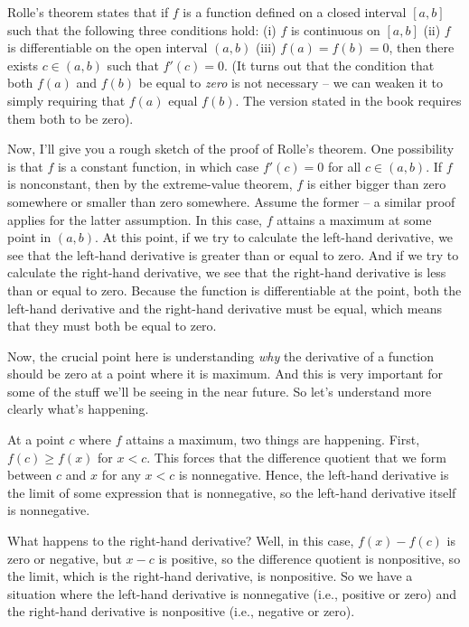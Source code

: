 \documentclass{amsart}
\begin{document}
Rolle's theorem states that if $f$ is a function defined on a closed
interval $[a,b]$ such that the following three conditions hold: (i)
$f$ is continuous on $[a,b]$ (ii) $f$ is differentiable on the open
interval $(a,b)$ (iii) $f(a) = f(b) = 0$, then there exists $c \in
(a,b)$ such that $f'(c) = 0$. (It turns out that the condition that
both $f(a)$ and $f(b)$ be equal to {\em zero} is not necessary -- we
can weaken it to simply requiring that $f(a)$ equal $f(b)$. The
version stated in the book requires them both to be zero).

Now, I'll give you a rough sketch of the proof of Rolle's theorem. One
possibility is that $f$ is a constant function, in which case $f'(c) =
0$ for all $c \in (a,b)$. If $f$ is nonconstant, then by the
extreme-value theorem, $f$ is either bigger than zero somewhere or
smaller than zero somewhere. Assume the former -- a similar proof
applies for the latter assumption. In this case, $f$ attains a maximum
at some point in $(a,b)$. At this point, if we try to calculate the
left-hand derivative, we see that the left-hand derivative is greater
than or equal to zero. And if we try to calculate the right-hand
derivative, we see that the right-hand derivative is less than or
equal to zero. Because the function is differentiable at the point,
both the left-hand derivative and the right-hand derivative must be
equal, which means that they must both be equal to zero.

Now, the crucial point here is understanding {\em why} the derivative
of a function should be zero at a point where it is maximum. And this
is very important for some of the stuff we'll be seeing in the near
future. So let's understand more clearly what's happening.

At a point $c$ where $f$ attains a maximum, two things are
happening. First, $f(c) \ge f(x)$ for $x < c$. This forces that the
difference quotient that we form between $c$ and $x$ for any $x < c$
is nonnegative. Hence, the left-hand derivative is the limit of some
expression that is nonnegative, so the left-hand derivative itself is
nonnegative.

What happens to the right-hand derivative? Well, in this case, $f(x) -
f(c)$ is zero or negative, but $x - c$ is positive, so the difference
quotient is nonpositive, so the limit, which is the right-hand
derivative, is nonpositive. So we have a situation where the left-hand
derivative is nonnegative (i.e., positive or zero) and the right-hand
derivative is nonpositive (i.e., negative or zero).
\end{document}
